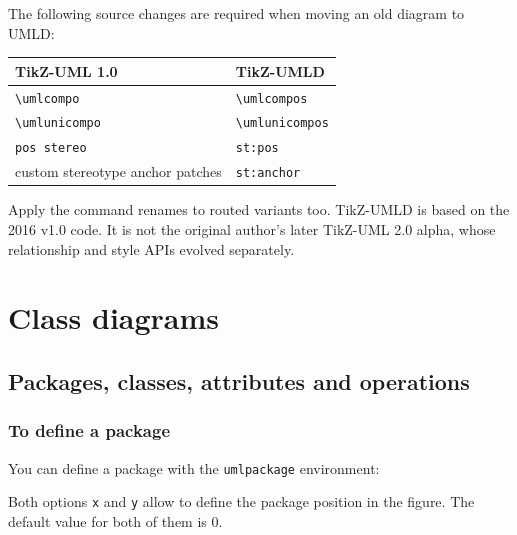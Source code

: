 \documentclass[a4paper,11pt]{report}
\begin{document}
The following source changes are required when moving an old diagram to UMLD:

\begin{center}
	\begin{tabular}{ll}
		TikZ-UML 1.0 & TikZ-UMLD \\
		\hline
		\texttt{\textbackslash umlcompo} & \texttt{\textbackslash umlcompos} \\
		\texttt{\textbackslash umlunicompo} & \texttt{\textbackslash umlunicompos} \\
		\texttt{pos stereo} & \texttt{st:pos} \\
		custom stereotype anchor patches & \texttt{st:anchor} \\
	\end{tabular}
\end{center}

Apply the command renames to routed variants too. TikZ-UMLD is based on the
2016 v1.0 code. It is not the original author's later TikZ-UML 2.0 alpha, whose
relationship and style APIs evolved separately.

\chapter{Class diagrams}\label{c.class}

\section{Packages, classes, attributes and operations}\label{s.packageclass}

\subsection{To define a package}\label{ss.package}

You can define a package with the {\tt umlpackage} environment:

\medskip

\begin{minipage}{0.5\textwidth}
	
\end{minipage}
\begin{minipage}{0.4\textwidth}
	\begin{center}
	\end{center}
\end{minipage}

\medskip

Both options {\tt x} and {\tt y} allow to define the package position in the figure.
The default value for both of them is 0.
\end{document}
